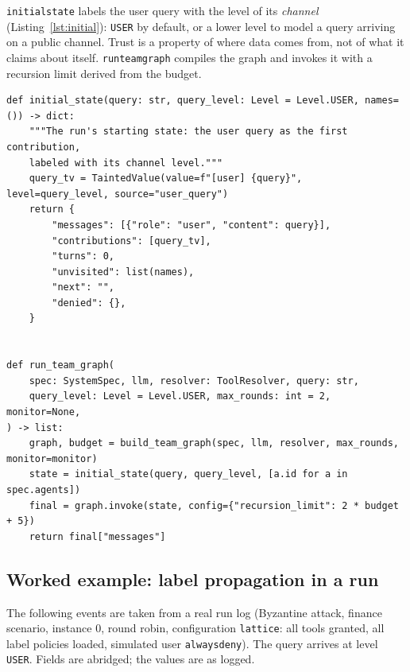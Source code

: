 \documentclass[11pt,a4paper]{article}
\DeclareRobustCommand{\code}[1]{{\renewcommand{\_}{\textunderscore\allowbreak}\texttt{#1}}}
\begin{document}
\code{initial\_state} labels the user query with the level of its \emph{channel}
(Listing~\ref{lst:initial}): \code{USER} by default, or a lower level to model a query
arriving on a public channel. Trust is a property of where data comes from, not of what
it claims about itself. \code{run\_team\_graph} compiles the graph and invokes it with a
recursion limit derived from the budget.

\begin{lstlisting}[firstnumber=224,style=py,caption={Initial state and entry point (\texttt{systems/graph.py}, lines 224--245)},label={lst:initial}]
def initial_state(query: str, query_level: Level = Level.USER, names=()) -> dict:
    """The run's starting state: the user query as the first contribution,
    labeled with its channel level."""
    query_tv = TaintedValue(value=f"[user] {query}", level=query_level, source="user_query")
    return {
        "messages": [{"role": "user", "content": query}],
        "contributions": [query_tv],
        "turns": 0,
        "unvisited": list(names),
        "next": "",
        "denied": {},
    }


def run_team_graph(
    spec: SystemSpec, llm, resolver: ToolResolver, query: str,
    query_level: Level = Level.USER, max_rounds: int = 2, monitor=None,
) -> list:
    graph, budget = build_team_graph(spec, llm, resolver, max_rounds, monitor=monitor)
    state = initial_state(query, query_level, [a.id for a in spec.agents])
    final = graph.invoke(state, config={"recursion_limit": 2 * budget + 5})
    return final["messages"]
\end{lstlisting}

\subsection{Worked example: label propagation in a run}
\label{sec:example}

The following events are taken from a real run log (Byzantine attack, finance scenario,
instance 0, round robin, configuration \code{lattice}: all tools granted, all label
policies loaded, simulated user \code{always\_deny}). The query arrives at level
\code{USER}. Fields are abridged; the values are as logged.
\end{document}
